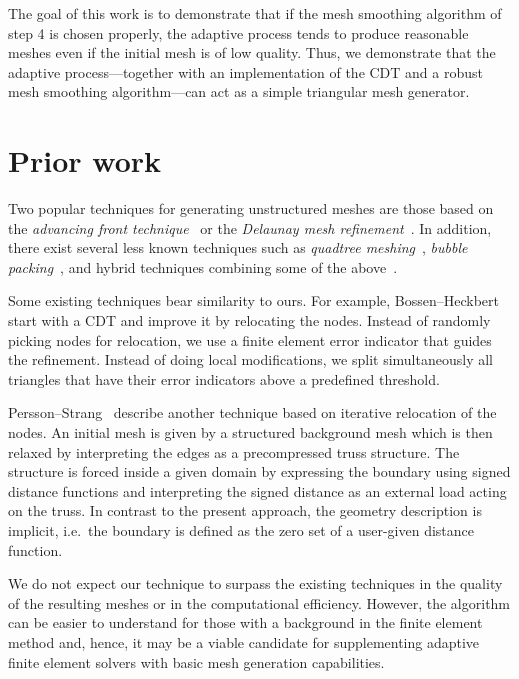 \documentclass[11pt]{article}
\begin{document}
The goal of this work is to demonstrate that if the mesh smoothing algorithm of
step 4 is chosen properly, the adaptive process tends to produce reasonable
meshes even if the initial mesh is of low quality.  Thus, we demonstrate that
the adaptive process---together with an implementation of the CDT and a robust
mesh smoothing algorithm---can act as a simple triangular mesh generator.

\section{Prior work}
\label{sec:org7798f6d}

Two popular techniques for generating unstructured meshes are those based on the
\emph{advancing front technique}~\cite{L_hner_1988} or the \emph{Delaunay mesh
refinement}~\cite{Chew_1989, Ruppert_1995, Shewchuk_2002}.  In addition, there
exist several less known techniques such as \emph{quadtree
meshing}~\cite{Yerry_1983}, \emph{bubble packing}~\cite{Shimada_1995}, and
hybrid techniques combining some of the above~\cite{mavriplis1995advancing}.

Some existing techniques bear similarity to ours.  For example,
Bossen--Heckbert~\cite{bossen1996pliant} start with a CDT and improve it by
relocating the nodes.  Instead of randomly picking nodes for relocation, we use
a finite element error indicator that guides the refinement.  Instead of doing
local modifications, we split simultaneously all triangles that have their error
indicators above a predefined threshold.

Persson--Strang~\cite{persson2004simple} describe another technique based on
iterative relocation of the nodes.  An initial mesh is given by a structured
background mesh which is then relaxed by interpreting the edges as a
precompressed truss structure.  The structure is forced inside a given domain by
expressing the boundary using signed distance functions and interpreting the
signed distance as an external load acting on the truss.  In contrast to the
present approach, the geometry description is implicit, i.e.~the boundary is
defined as the zero set of a user-given distance function.

We do not expect our technique to surpass the existing techniques in the quality
of the resulting meshes or in the computational efficiency.  However, the
algorithm can be easier to understand for those with a background in the finite
element method and, hence, it may be a viable candidate for supplementing
adaptive finite element solvers with basic mesh generation capabilities.
\end{document}
